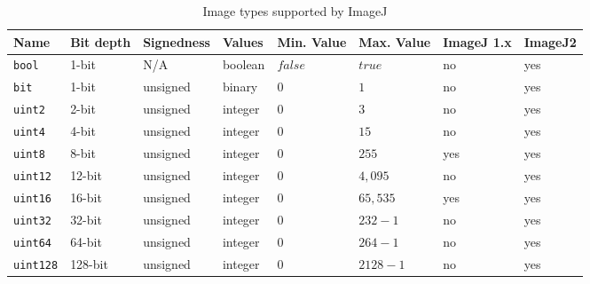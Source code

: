 \documentclass{bmcart}
\begin{document}
\begin{backmatter}
  \begin{table}[h!]
    \caption{Image types supported by ImageJ}
    \begin{tabular}{| l | l | l | p{0.4in} | p{0.8in} | p{0.8in} | l | l |}
      \hline
      \textbf{Name}        & \textbf{Bit depth} & \textbf{Signedness} & \textbf{Values} & \textbf{Min. Value}     & \textbf{Max. Value}    & \textbf{ImageJ 1.x} & \textbf{ImageJ2} \\ \hline
      \texttt{bool}        & 1-bit              & N/A                 & boolean         & $false$                 & $true$                 & no                  & yes              \\ \hline
      \texttt{bit}         & 1-bit              & unsigned            & binary          & $0$                     & $1$                    & no                  & yes              \\ \hline
      \texttt{uint2}       & 2-bit              & unsigned            & integer         & $0$                     & $3$                    & no                  & yes              \\ \hline
      \texttt{uint4}       & 4-bit              & unsigned            & integer         & $0$                     & $15$                   & no                  & yes              \\ \hline
      \texttt{uint8}       & 8-bit              & unsigned            & integer         & $0$                     & $255$                  & yes                 & yes              \\ \hline
      \texttt{uint12}      & 12-bit             & unsigned            & integer         & $0$                     & $4,095$                & no                  & yes              \\ \hline
      \texttt{uint16}      & 16-bit             & unsigned            & integer         & $0$                     & $65,535$               & yes                 & yes              \\ \hline
      \texttt{uint32}      & 32-bit             & unsigned            & integer         & $0$                     & $232 - 1$              & no                  & yes              \\ \hline
      \texttt{uint64}      & 64-bit             & unsigned            & integer         & $0$                     & $264 - 1$              & no                  & yes              \\ \hline
      \texttt{uint128}     & 128-bit            & unsigned            & integer         & $0$                     & $2128 - 1$             & no                  & yes              \\ \hline

\end{tabular}
\end{table}
\end{backmatter}
\end{document}
